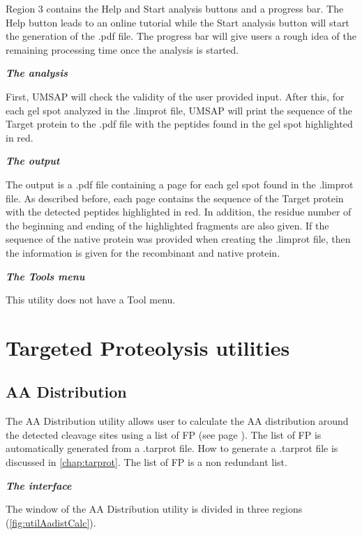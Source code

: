 Region \num{3} contains the Help and Start analysis buttons and a progress bar. The Help button leads to an online tutorial while the Start analysis button will start the generation of the .pdf file. The progress bar will give users a rough idea of the remaining processing time once the analysis is started.

\textit{\textbf{The analysis}}

First, UMSAP will check the validity of the user provided input. After this, for each gel spot analyzed in the .limprot file, UMSAP will print the sequence of the Target protein to the .pdf file with the peptides found in the gel spot highlighted in red.

\textit{\textbf{The output}} 

The output is a .pdf file containing a page for each gel spot found in the .limprot file. As described before, each page contains the sequence of the Target protein with the detected peptides highlighted in red. In addition, the residue number of the beginning and ending of the highlighted fragments are also given. If the sequence of the native protein was provided when creating the .limprot file, then the information is given for the recombinant and native protein. 

\textit{\textbf{The Tools menu}}

This utility does not have a Tool menu.

\section{Targeted Proteolysis utilities }  

\subsection{AA Distribution}
\label{subsec:utilAadistCalc}
The AA Distribution utility allows user to calculate the AA distribution around the detected cleavage sites using a list of FP (see page \pageref{par:tarprotPIP}). The list of FP is automatically generated from a .tarprot file. How to generate a .tarprot file is discussed in \autoref{chap:tarprot}. The list of FP is a non redundant list. 

\textit{\textbf{The interface}}

The window of the AA Distribution utility is divided in three regions (\autoref{fig:utilAadistCalc}).

